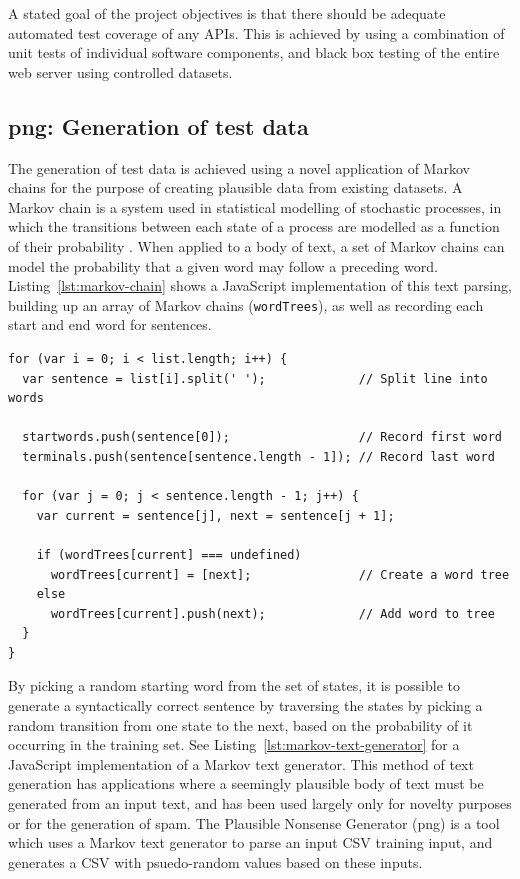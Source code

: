 A stated goal of the project objectives is that there should be
adequate automated test coverage of any APIs. This is achieved by
using a combination of unit tests of individual software components,
and black box testing of the entire web server using controlled
datasets.

\subsection{png: Generation of test data}\label{subsec:png}

The generation of test data is achieved using a novel application of
Markov chains for the purpose of creating plausible data from existing
datasets. A Markov chain is a system used in statistical modelling of
stochastic processes, in which the transitions between each state of a
process are modelled as a function of their probability
\cite{atwood2008markov}. When applied to a body of text, a set of
Markov chains can model the probability that a given word may follow a
preceding word. Listing~\ref{lst:markov-chain} shows a JavaScript
implementation of this text parsing, building up an array of Markov
chains (\texttt{wordTrees}), as well as recording each start and end
word for sentences.

\br{}


\lstset{language=JavaScript}
\begin{lstlisting}[label=lst:markov-chain,caption={%
      [Markov chain implementation]
      Markov chain implementation in JavaScript.}]
for (var i = 0; i < list.length; i++) {
  var sentence = list[i].split(' ');             // Split line into words

  startwords.push(sentence[0]);                  // Record first word
  terminals.push(sentence[sentence.length - 1]); // Record last word

  for (var j = 0; j < sentence.length - 1; j++) {
    var current = sentence[j], next = sentence[j + 1];

    if (wordTrees[current] === undefined)
      wordTrees[current] = [next];               // Create a word tree
    else
      wordTrees[current].push(next);             // Add word to tree
  }
}
\end{lstlisting}


By picking a random starting word from the set of states, it is
possible to generate a syntactically correct sentence by traversing
the states by picking a random transition from one state to the next,
based on the probability of it occurring in the training set. See
Listing~\ref{lst:markov-text-generator} for a JavaScript
implementation of a Markov text generator. This method of text
generation has applications where a seemingly plausible body of text
must be generated from an input text, and has been used largely only
for novelty purposes or for the generation of spam. The Plausible
Nonsense Generator (png) is a tool which uses a Markov text generator
to parse an input CSV training input, and generates a CSV with
psuedo-random values based on these inputs.

